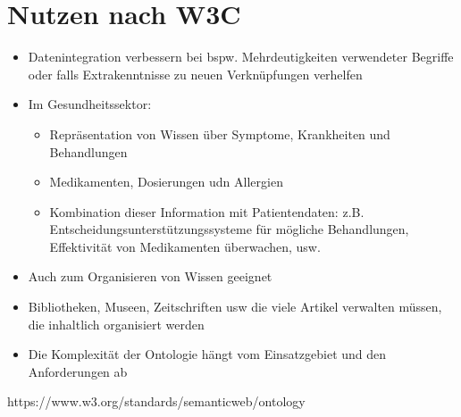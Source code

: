 \section*{Nutzen nach W3C}
\begin{itemize}
	\item Datenintegration verbessern bei bspw. Mehrdeutigkeiten verwendeter Begriffe oder falls Extrakenntnisse zu neuen Verknüpfungen verhelfen
	\item Im Gesundheitssektor:
	\begin{itemize}
		\item Repräsentation von Wissen über Symptome, Krankheiten und Behandlungen
		\item Medikamenten, Dosierungen udn Allergien
		\item Kombination dieser Information mit Patientendaten: z.B. Entscheidungsunterstützungssysteme für mögliche Behandlungen, Effektivität von Medikamenten überwachen, usw.
	\end{itemize}
	\item Auch zum Organisieren von Wissen geeignet
	\item Bibliotheken, Museen, Zeitschriften usw die viele Artikel verwalten müssen, die inhaltlich organisiert werden
	\item Die Komplexität der Ontologie hängt vom Einsatzgebiet und den Anforderungen ab
\end{itemize}
https://www.w3.org/standards/semanticweb/ontology